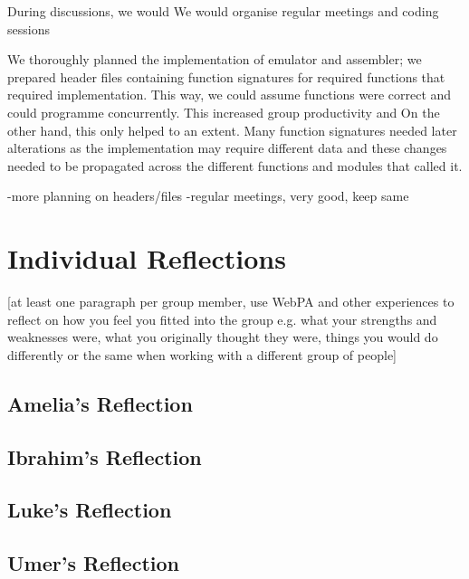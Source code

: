 \documentclass[11pt]{article}
\begin{document}
During discussions, we would 
We would organise regular meetings and coding sessions


We thoroughly planned the implementation of emulator and assembler; we prepared header files containing function signatures
for required functions that 
 required implementation. This way, we could assume functions were correct and could programme concurrently.
This increased group productivity and 
On the other hand, this only helped to an extent. Many function signatures needed later alterations 
as the implementation may require different data and these changes needed to be propagated 
across the different functions and modules that called it.


-more planning on headers/files
-regular meetings, very good, keep same



\section{Individual Reflections}
[at least one paragraph per group member, use WebPA and other experiences to reflect on how you feel you fitted into the group e.g. what your strengths and weaknesses were, what you originally thought they were, things you would do differently or the same when working with a different group of people]
\subsection{Amelia's Reflection}

\subsection{Ibrahim's Reflection}

\subsection{Luke's Reflection}

\subsection{Umer's Reflection}
\end{document}

